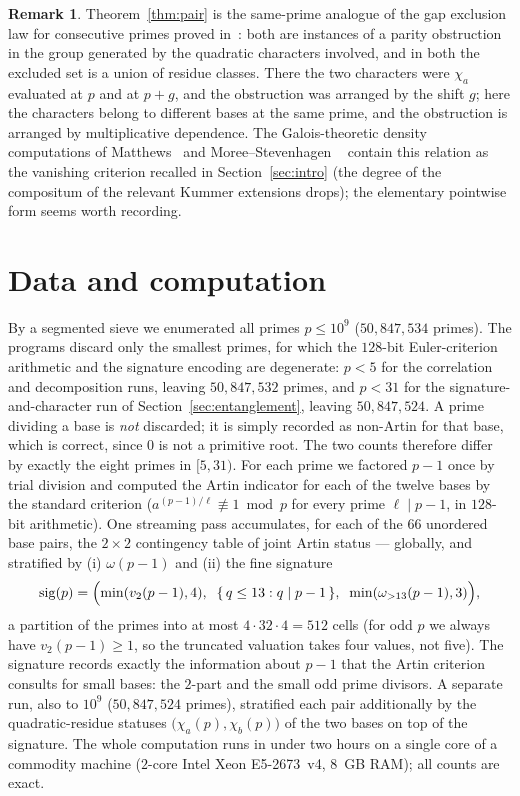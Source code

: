 \documentclass[11pt,reqno]{amsart}
\theoremstyle{plain}
\theoremstyle{definition}
\newtheorem{remark}[theorem]{Remark}
\begin{document}
\begin{remark}
Theorem~\ref{thm:pair} is the same-prime analogue of the gap exclusion law
for consecutive primes proved in~\cite{BaldII}: both are
instances of a parity obstruction in the group generated by the quadratic
characters involved, and in both the excluded set is a union of residue
classes. There the two characters were $\chi_a$ evaluated at $p$
and at $p + g$, and the obstruction was arranged by the shift $g$; here the
characters belong to different bases at the same prime, and the obstruction
is arranged by multiplicative dependence. The Galois-theoretic density
computations of Matthews~\cite{Matthews1976} and Moree--Stevenhagen%
~\cite{MoreeStevenhagen2014} contain this relation as the vanishing criterion
recalled in Section~\ref{sec:intro} (the degree of the compositum of the
relevant Kummer extensions drops); the elementary pointwise form seems worth
recording.
\end{remark}

\section{Data and computation}
\label{sec:data}

By a segmented sieve we enumerated all primes $p \le 10^9$
($50{,}847{,}534$ primes). The programs discard only the smallest primes, for
which the $128$-bit Euler-criterion arithmetic and the signature encoding are
degenerate: $p < 5$ for the correlation and decomposition runs, leaving
$50{,}847{,}532$ primes, and $p < 31$ for the signature-and-character run of
Section~\ref{sec:entanglement}, leaving $50{,}847{,}524$. A prime dividing a
base is \emph{not} discarded; it is simply recorded as non-Artin for that base,
which is correct, since $0$ is not a primitive root. The two counts therefore
differ by exactly the eight primes in $[5, 31)$. For each prime we
factored $p - 1$ once by trial division and computed the Artin indicator for
each of the twelve bases by the standard criterion
($a^{(p-1)/\ell} \not\equiv 1 \bmod p$ for every prime $\ell \mid p-1$, in
$128$-bit arithmetic). One streaming pass accumulates, for each of the $66$
unordered base pairs, the $2 \times 2$ contingency table of joint Artin
status --- globally, and stratified by (i) $\omega(p-1)$ and (ii) the fine
signature
\[
  \mathrm{sig}(p) = \Bigl(\min(v_2(p-1), 4),\;\;
  \{\, q \le 13 : q \mid p-1 \,\},\;\; \min(\omega_{>13}(p-1), 3)\Bigr),
\]
a partition of the primes into at most $4 \cdot 32 \cdot 4 = 512$ cells (for
odd $p$ we always have $v_2(p-1) \ge 1$, so the truncated valuation takes four
values, not five). The
signature records exactly the information about $p-1$ that the Artin
criterion consults for small bases: the $2$-part and the small odd prime
divisors. A separate run, also to $10^9$ ($50{,}847{,}524$ primes), stratified
each pair additionally by the quadratic-residue statuses
$\bigl(\chi_a(p), \chi_b(p)\bigr)$ of the two bases on top of the signature.
The whole computation runs in under two hours on a single core of a
commodity machine ($2$-core Intel Xeon E5-2673~v4, $8$~GB RAM); all counts
are exact.
\end{document}
